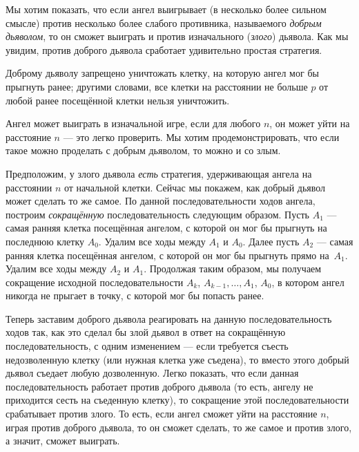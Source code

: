 Мы хотим показать, что если ангел выигрывает (в несколько более сильном смысле) против несколько более слабого противника, называемого \emph{добрым дьяволом}, то он сможет выиграть и против изначального (\emph{злого}) дьявола.
Как мы увидим, против доброго дьявола сработает удивительно простая стратегия.

Доброму дьяволу запрещено уничтожать клетку, на которую ангел мог бы прыгнуть ранее;
другими словами, все клетки на расстоянии не больше $p$ от любой ранее посещённой клетки нельзя уничтожить.

Ангел может выиграть в изначальной игре, если для любого $n$, он может уйти на расстояние $n$ ---
это легко проверить.
Мы хотим продемонстрировать, что если такое можно проделать с добрым дьяволом, то можно и со злым.

Предположим, у злого дьявола \emph{есть} стратегия, удерживающая ангела на расстоянии $n$ от начальной клетки.
Сейчас мы покажем, как добрый дьявол может сделать то же самое.
По данной последовательности ходов ангела, построим \emph{сокращённую} последовательность следующим образом.
Пусть $A_1$ --- самая ранняя клетка посещённая ангелом, с которой он мог бы прыгнуть на последнюю клетку $A_0$.
Удалим все ходы между $A_1$ и $A_0$.
Далее пусть $A_2$ --- самая ранняя клетка посещённая ангелом, с которой он мог бы прыгнуть прямо на~$A_1$.
Удалим все ходы между $A_2$ и $A_1$.
Продолжая таким образом, мы получаем сокращение исходной последовательности $A_k$, $A_{k-1}, \dots, A_1$, $A_0$, в котором ангел никогда не прыгает в точку, с которой мог бы попасть ранее.

Теперь заставим доброго дьявола реагировать на данную последовательность ходов так, как это сделал бы злой дьявол в ответ на сокращённую последовательность, с одним изменением --- если требуется съесть недозволенную клетку (или нужная клетка уже съедена), то вместо этого добрый дьявол съедает любую дозволенную.
Легко показать, что если данная последовательность работает против доброго дьявола (то есть, ангелу не приходится сесть на съеденную клетку), то сокращение этой последовательности срабатывает против злого.
То есть, если ангел сможет уйти на расстояние $n$, играя против доброго дьявола, то он сможет сделать, то же самое и против злого, а значит, сможет выиграть.

